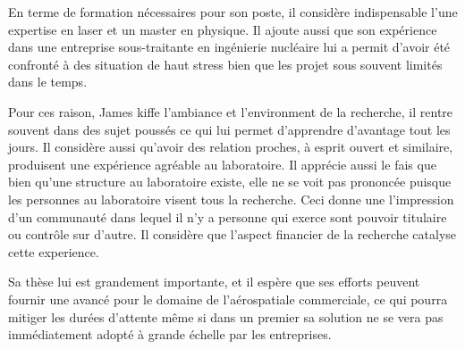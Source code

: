 \documentclass[11pt, openright]{book}
\begin{document}
    En terme de formation nécessaires pour son poste, il considère indispensable l'une expertise en laser et un master en physique. Il ajoute aussi que son expérience dans une entreprise sous-traitante en ingénierie nucléaire lui a permit d'avoir été confronté à des situation de haut stress bien que les projet sous souvent limités dans le temps. 
    
    Pour ces raison, James kiffe l'ambiance et l'environment de la recherche, il rentre souvent dans des sujet poussés ce qui lui permet d'apprendre d'avantage tout les jours. Il considère aussi qu'avoir des relation proches, à esprit ouvert et similaire, produisent une expérience agréable au laboratoire. Il apprécie aussi le fais que bien qu'une structure au laboratoire existe, elle ne se voit pas prononcée puisque les personnes au laboratoire visent tous la recherche. Ceci donne une l'impression d'un communauté dans lequel il n'y a personne qui exerce sont pouvoir titulaire ou contrôle sur d'autre. Il considère que l'aspect financier de la recherche catalyse cette experience. 
    
    Sa thèse lui est grandement importante, et il espère que ses efforts peuvent fournir une avancé pour le domaine de l'aérospatiale commerciale, ce qui pourra mitiger les durées d'attente même si dans un premier sa solution ne se vera pas immédiatement adopté à grande échelle par les entreprises.




    
\end{document}

